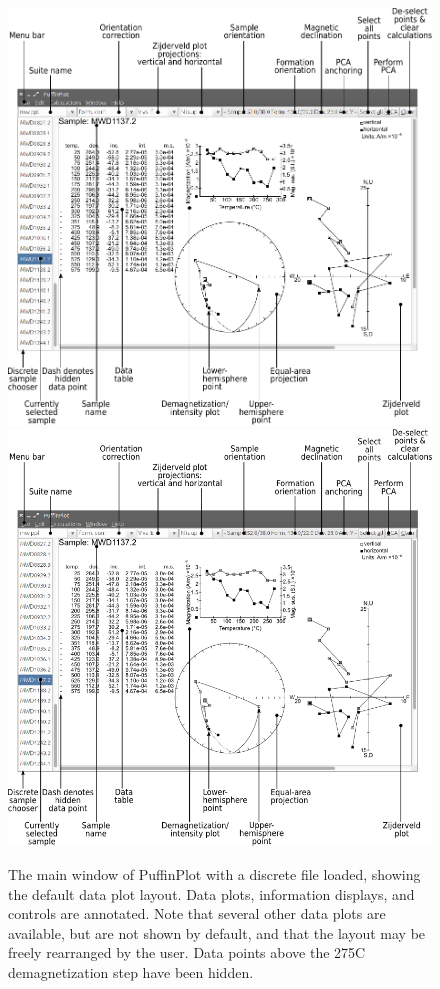 \documentclass[a4paper,british]{article}
\begin{document}
\begin{figure}[htbp]
\centering
\ifpdf\includegraphics{figures/annot-scrnshot.pdf}
\else\includegraphics{figures/annot-scrnshot.png}
\fi
\caption{\label{fig:screenshot}The main window of PuffinPlot with a discrete file loaded,
showing the default data plot layout. Data plots, information displays,
and controls are annotated. Note that several other data plots are
available, but are not shown by default, and that the layout may be
freely rearranged by the user. Data points above the 275\textdegree C
demagnetization step have been hidden.}
\end{figure}
\end{document}
